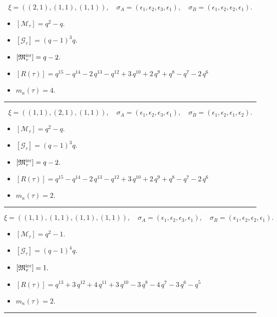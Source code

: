 \documentclass[10pt,a4paper]{amsart}
\begin{document}
$$\xi = ({(2, 1), (1, 1)}, {(1, 1)}),\quad \sigma_A = ({{\epsilon_1, \epsilon_2}, {\epsilon_3}}, {{\epsilon_1}}),\quad \sigma_B = ({{\epsilon_1, \epsilon_2}, {\epsilon_2}}, {{\epsilon_1}}).$$

\begin{itemize}
 \item $[\mathcal{M}_{\tau}] = q^{2} - q .$

 \item $[\mathcal{G}_{\tau}] = {\left(q - 1\right)}^{3} q .$

 \item $[{\frak M}_{\tau}^{\textrm{irr}}] = q - 2 .$

 \item $[R(\tau)] = q^{15} - q^{14} - 2 \, q^{13} - q^{12} + 3 \, q^{10} + 2 \, q^{9} + q^{8} - q^{7} - 2 \, q^{6} $

 \item $m_{\kappa}(\tau) = 4 .$

 \end{itemize}
\noindent\rule{8cm}{0.4pt}

$$\xi = ({(1, 1), (2, 1)}, {(1, 1)}),\quad \sigma_A = ({{\epsilon_1}, {\epsilon_2, \epsilon_3}}, {{\epsilon_1}}),\quad \sigma_B = ({{\epsilon_1}, {\epsilon_2, \epsilon_1}}, {{\epsilon_2}}).$$

\begin{itemize}
 \item $[\mathcal{M}_{\tau}] = q^{2} - q .$

 \item $[\mathcal{G}_{\tau}] = {\left(q - 1\right)}^{3} q .$

 \item $[{\frak M}_{\tau}^{\textrm{irr}}] = q - 2 .$

 \item $[R(\tau)] = q^{15} - q^{14} - 2 \, q^{13} - q^{12} + 3 \, q^{10} + 2 \, q^{9} + q^{8} - q^{7} - 2 \, q^{6} $

 \item $m_{\kappa}(\tau) = 2 .$

 \end{itemize}
\noindent\rule{8cm}{0.4pt}

$$\xi = ({(1, 1), (1, 1), (1, 1)}, {(1, 1)}),\quad \sigma_A = ({{\epsilon_1}, {\epsilon_2}, {\epsilon_3}}, {{\epsilon_1}}),\quad \sigma_B = ({{\epsilon_1}, {\epsilon_2}, {\epsilon_2}}, {{\epsilon_1}}).$$

\begin{itemize}
 \item $[\mathcal{M}_{\tau}] = q^{2} - 1 .$

 \item $[\mathcal{G}_{\tau}] = {\left(q - 1\right)}^{4} q .$

 \item $[{\frak M}_{\tau}^{\textrm{irr}}] = 1 .$

 \item $[R(\tau)] = q^{13} + 3 \, q^{12} + 4 \, q^{11} + 3 \, q^{10} - 3 \, q^{8} - 4 \, q^{7} - 3 \, q^{6} - q^{5} $

 \item $m_{\kappa}(\tau) = 2 .$

 \end{itemize}
\noindent\rule{8cm}{0.4pt}
\end{document}
